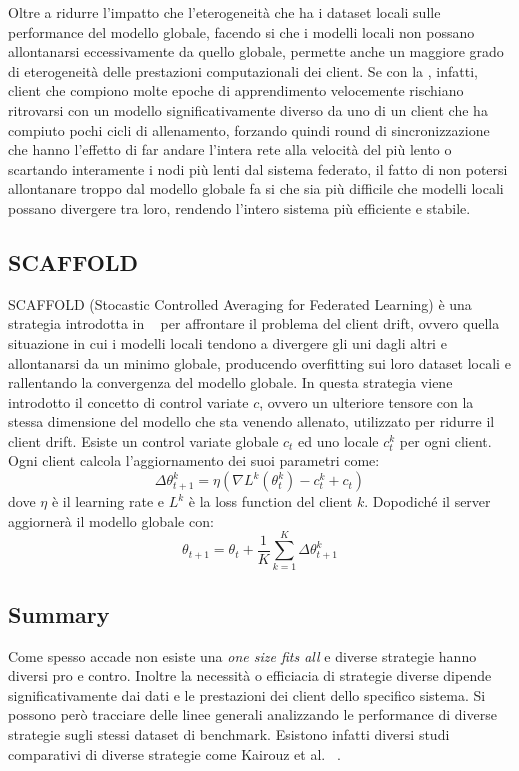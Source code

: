 Oltre a ridurre l'impatto che l'eterogeneità che ha i dataset locali 
sulle performance del modello globale, facendo si che i modelli locali 
non possano allontanarsi eccessivamente da quello globale, permette 
anche un maggiore grado di eterogeneità delle prestazioni computazionali 
dei client. Se con la , infatti, client che compiono 
molte epoche di apprendimento velocemente rischiano ritrovarsi con un 
modello significativamente diverso da uno di un client che ha compiuto
pochi cicli di allenamento, forzando quindi round di sincronizzazione
che hanno l'effetto di far andare l'intera rete alla velocità del più
lento o scartando interamente i nodi più lenti dal sistema federato, 
il fatto di non potersi allontanare troppo dal modello globale fa si
che sia più difficile che modelli locali possano divergere tra loro,
rendendo l'intero sistema più efficiente e stabile.


\subsection{SCAFFOLD}
SCAFFOLD (Stocastic Controlled Averaging for Federated Learning) è una 
strategia introdotta in ~\cite{Karimireddy2020scaffold} per 
affrontare il problema del client drift, ovvero quella situazione in 
cui i modelli locali tendono a divergere gli uni dagli altri e allontanarsi 
da un minimo globale, producendo overfitting sui loro dataset locali 
e rallentando la convergenza del modello globale.
In questa strategia viene introdotto il concetto di control variate
\(c\), ovvero un ulteriore tensore con la stessa dimensione del modello 
che sta venendo allenato, utilizzato per ridurre il client drift. 
Esiste un control variate globale \(c_t\) ed uno locale \(c_t^k\) per 
ogni client. Ogni client calcola l'aggiornamento dei suoi parametri come:
\[
\Delta\theta_{t+1}^k = \eta (\nabla L^k(\theta_t^k) -c_t^k +c_t)
\]
dove \(\eta\) è il learning rate e \(L^k\) è la loss function del 
client \(k\). Dopodiché il server aggiornerà il modello globale con:
\[
\theta_{t+1} = \theta_t + \frac{1}{K} \sum_{k=1}^{K} \Delta\theta_{t+1}^k
\]

\subsection{Summary}
Come spesso accade non esiste una \textit{one size fits all} e diverse 
strategie hanno diversi pro e contro. Inoltre la necessità o efficiacia 
di strategie diverse dipende significativamente dai dati e le prestazioni 
dei client dello specifico sistema. Si possono però tracciare delle 
linee generali analizzando le performance di diverse strategie sugli 
stessi dataset di benchmark. Esistono infatti diversi studi comparativi 
di diverse strategie come Kairouz et al.  ~\cite{kairouz2021flOpenProblems}.


